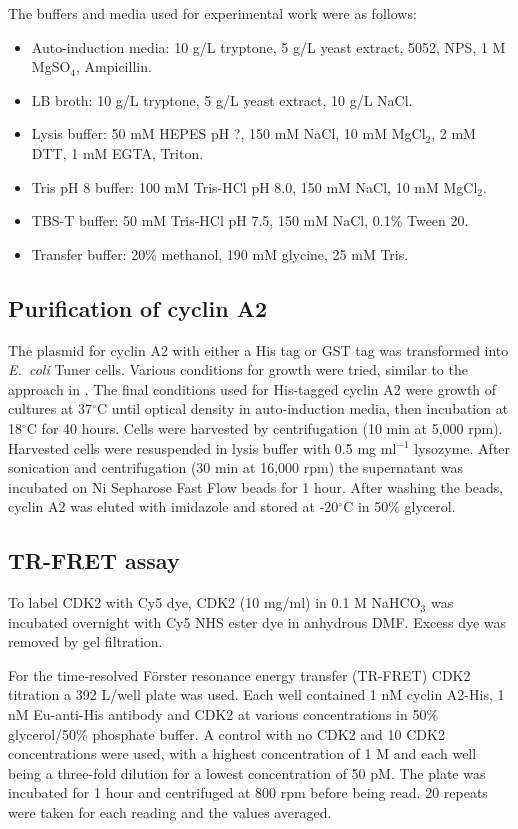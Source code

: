 The buffers and media used for experimental work were as follows:
\begin{itemize}
\item Auto-induction media: 10 g/L tryptone, 5 g/L yeast extract, 5052, NPS, 1 M MgSO$_{4}$, Ampicillin.
\item LB broth: 10 g/L tryptone, 5 g/L yeast extract, 10 g/L NaCl.
\item Lysis buffer: 50 mM HEPES pH ?, 150 mM NaCl, 10 mM MgCl$_{2}$, 2 mM DTT, 1 mM EGTA, Triton.
\item Tris pH 8 buffer: 100 mM Tris-HCl pH 8.0, 150 mM NaCl, 10 mM MgCl$_{2}$.
\item TBS-T buffer: 50 mM Tris-HCl pH 7.5, 150 mM NaCl, 0.1\% Tween 20.
\item Transfer buffer: 20\% methanol, 190 mM glycine, 25 mM Tris.
\end{itemize}


\subsection{Purification of cyclin A2}

The plasmid for cyclin A2 with either a His tag or GST tag was transformed into \textit{E.\ coli} Tuner cells.
Various conditions for growth were tried, similar to the approach in \cite{Wang2007}.
The final conditions used for His-tagged cyclin A2 were growth of cultures at 37$^{\circ}$C until optical density in auto-induction media, then incubation at 18$^{\circ}$C for 40 hours.
Cells were harvested by centrifugation (10 min at 5,000 rpm).
Harvested cells were resuspended in lysis buffer with 0.5 mg ml$^{-1}$ lysozyme.
After sonication and centrifugation (30 min at 16,000 rpm) the supernatant was incubated on Ni Sepharose Fast Flow beads for 1 hour.
After washing the beads, cyclin A2 was eluted with imidazole and stored at -20$^{\circ}$C in 50\% glycerol.


\subsection{TR-FRET assay}

To label CDK2 with Cy5 dye, CDK2 (10 mg/ml) in 0.1 M NaHCO$_{3}$ was incubated overnight with Cy5 NHS ester dye in anhydrous DMF.
Excess dye was removed by gel filtration.

For the time-resolved F\"{o}rster resonance energy transfer (TR-FRET) CDK2 titration a 392 \textmu L/well plate was used.
Each well contained 1 nM cyclin A2-His, 1 nM Eu-anti-His antibody and CDK2 at various concentrations in 50\% glycerol/50\% phosphate buffer.
A control with no CDK2 and 10 CDK2 concentrations were used, with a highest concentration of 1 \textmu M and each well being a three-fold dilution for a lowest concentration of 50 pM.
The plate was incubated for 1 hour and centrifuged at 800 rpm before being read.
20 repeats were taken for each reading and the values averaged.


